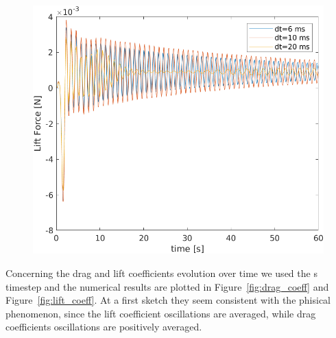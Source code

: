 \documentclass[12pt]{article}
\begin{document}
        \begin{figure}[!ht]
                \includegraphics[width=\textwidth]{LiftForce.png}
                \centering
                \caption{}
                \label{fig:lift}
        \end{figure}

Concerning the drag and lift coefficients evolution over time we used the  \:s timestep and the numerical results are plotted  in Figure~\ref{fig:drag_coeff} and  Figure~\ref{fig:lift_coeff}. At a first sketch they seem consistent with the phisical phenomenon, since the lift coefficient oscillations are  averaged, while drag coefficients oscillations are positively averaged. 
\end{document}
